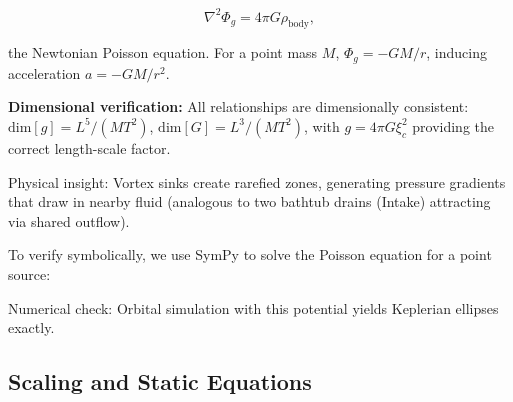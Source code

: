 \[
\nabla^2 \Phi_g = 4\pi G \rho_{\text{body}},
\]

the Newtonian Poisson equation. For a point mass $M$, $\Phi_g = -G M / r$, inducing acceleration $a = -G M / r^2$.

\noindent\textbf{Dimensional verification:} All relationships are dimensionally consistent: $\mathrm{dim}[g] = L^5/(MT^2)$, $\mathrm{dim}[G] = L^3/(MT^2)$, with $g = 4\pi G \xi_c^2$ providing the correct length-scale factor.

\medskip
\noindent
{}
\medskip

Physical insight: Vortex sinks create rarefied zones, generating pressure gradients that draw in nearby fluid (analogous to two bathtub drains (Intake) attracting via shared outflow).

To verify symbolically, we use SymPy to solve the Poisson equation for a point source:


Numerical check: Orbital simulation with this potential yields Keplerian ellipses exactly.

\medskip
\noindent
{}
\medskip

\subsection{Scaling and Static Equations}

